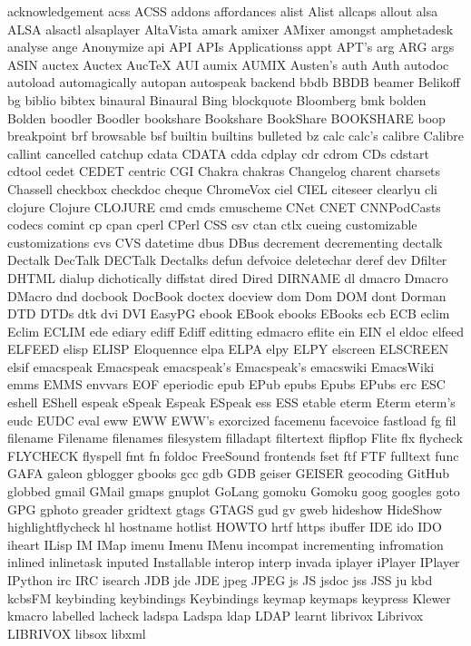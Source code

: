acknowledgement
acss
ACSS
addons
affordances
alist
Alist
allcaps
allout
alsa
ALSA
alsactl
alsaplayer
AltaVista
amark
amixer
AMixer
amongst
amphetadesk
analyse
ange
Anonymize
api
API
APIs
Applicationss
appt
APT's
arg
ARG
args
ASIN
auctex
Auctex
AucTeX
AUI
aumix
AUMIX
Austen's
auth
Auth
autodoc
autoload
automagically
autopan
autospeak
backend
bbdb
BBDB
beamer
Belikoff
bg
biblio
bibtex
binaural
Binaural
Bing
blockquote
Bloomberg
bmk
bolden
Bolden
boodler
Boodler
bookshare
Bookshare
BookShare
BOOKSHARE
boop
breakpoint
brf
browsable
bsf
builtin
builtins
bulleted
bz
calc
calc's
calibre
Calibre
callint
cancelled
catchup
cdata
CDATA
cdda
cdplay
cdr
cdrom
CDs
cdstart
cdtool
cedet
CEDET
centric
CGI
Chakra
chakras
Changelog
charent
charsets
Chassell
checkbox
checkdoc
cheque
ChromeVox
ciel
CIEL
citeseer
clearlyu
cli
clojure
Clojure
CLOJURE
cmd
cmds
cmuscheme
CNet
CNET
CNNPodCasts
codecs
comint
cp
cpan
cperl
CPerl
CSS
csv
ctan
ctlx
cueing
customizable
customizations
cvs
CVS
datetime
dbus
DBus
decrement
decrementing
dectalk
Dectalk
DecTalk
DECTalk
Dectalks
defun
defvoice
deletechar
deref
dev
Dfilter
DHTML
dialup
dichotically
diffstat
dired
Dired
DIRNAME
dl
dmacro
Dmacro
DMacro
dnd
docbook
DocBook
doctex
docview
dom
Dom
DOM
dont
Dorman
DTD
DTDs
dtk
dvi
DVI
EasyPG
ebook
EBook
ebooks
EBooks
ecb
ECB
eclim
Eclim
ECLIM
ede
ediary
ediff
Ediff
editting
edmacro
eflite
ein
EIN
el
eldoc
elfeed
ELFEED
elisp
ELISP
Eloquennce
elpa
ELPA
elpy
ELPY
elscreen
ELSCREEN
elsif
emacspeak
Emacspeak
emacspeak's
Emacspeak's
emacswiki
EmacsWiki
emms
EMMS
envvars
EOF
eperiodic
epub
EPub
epubs
Epubs
EPubs
erc
ESC
eshell
EShell
espeak
eSpeak
Espeak
ESpeak
ess
ESS
etable
eterm
Eterm
eterm's
eudc
EUDC
eval
eww
EWW
EWW's
exorcized
facemenu
facevoice
fastload
fg
fil
filename
Filename
filenames
filesystem
filladapt
filtertext
flipflop
Flite
flx
flycheck
FLYCHECK
flyspell
fmt
fn
foldoc
FreeSound
frontends
fset
ftf
FTF
fulltext
func
GAFA
galeon
gblogger
gbooks
gcc
gdb
GDB
geiser
GEISER
geocoding
GitHub
globbed
gmail
GMail
gmaps
gnuplot
GoLang
gomoku
Gomoku
goog
googles
goto
GPG
gphoto
greader
gridtext
gtags
GTAGS
gud
gv
gweb
hideshow
HideShow
highlightflycheck
hl
hostname
hotlist
HOWTO
hrtf
https
ibuffer
IDE
ido
IDO
iheart
ILisp
IM
IMap
imenu
Imenu
IMenu
incompat
incrementing
infromation
inlined
inlinetask
inputed
Installable
interop
interp
invada
iplayer
iPlayer
IPlayer
IPython
irc
IRC
isearch
JDB
jde
JDE
jpeg
JPEG
js
JS
jsdoc
jss
JSS
ju
kbd
kcbsFM
keybinding
keybindings
Keybindings
keymap
keymaps
keypress
Klewer
kmacro
labelled
lacheck
ladspa
Ladspa
ldap
LDAP
learnt
librivox
Librivox
LIBRIVOX
libsox
libxml
